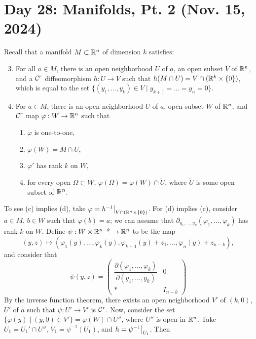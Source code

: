 \section{Day 28: Manifolds, Pt. 2 (Nov. 15, 2024)}
Recall that a manifold $M \subset \mathbb R^n$ of dimension $k$ satisfies:
\begin{enumerate}[label=(\alph*)]
    \setcounter{enumi}{2}
    \item For all $a \in M$, there is an open neighborhood $U$ of $a$, an open subset $V$ of $\mathbb R^n$, and a $\mathcal C^r$ diffeomorphism $h : U \to V$ such that $h(M \cap U) = V \cap (\mathbb R^k \times \{0\})$, which is equal to the set $\{(y_1, \dots, y_k) \in V \mid y_{k+1} = \dots = y_n = 0 \}$.
    \item For $a \in M$, there is an open neighborhood $U$ of $a$, open subset $W$ of $\mathbb R^n$, and $\mathcal C^r$ map $\varphi : W \to \mathbb R^n$ such that
        \begin{enumerate}[label=(\roman*)]
            \item $\varphi$ is one-to-one,
            \item $\varphi(W) = M \cap U$,
            \item $\varphi'$ has rank $k$ on $W$,
            \item for every open $\Omega \subset W$, $\varphi(\Omega) = \varphi(W) \cap \tilde{U}$, where $\tilde{U}$ is some open subset of $\mathbb R^n$.
        \end{enumerate}
\end{enumerate}
To see (c) implies (d), take $\varphi = \restr{h^{-1}}{V \cap (\RR^n \times \{0\})}$. For (d) implies (c), consider $a \in M$, $b \in W$ such that $\varphi(b) = a$; we can assume that $\partial_{y_1, \dots, y_k} (\varphi_1, \dots, \varphi_k)$ has rank $k$ on $W$. Define $\psi : W \times \mathbb R^{n-k}\to \mathbb R^n$ to be the map
\[ (y, z) \mapsto (\varphi_1(y), \dots, \varphi_k(y), \varphi_{k+1}(y) + z_1, \dots, \varphi_{n}(y) + z_{n-k}), \]
and consider that
\[ \psi(y, z) = \left(\begin{array}{c|c} \dfrac{\partial (\varphi_1, \dots, \varphi_k)}{\partial (y_1, \dots, y_k)} & 0 \\ \hline \ast & I_{n-k} \end{array}\right) \]
By the inverse function theorem, there exists an open neighborhood $V'$ of $(k, 0)$, $U'$ of $a$ such that $\psi : U' \to V'$ is $\mathcal C^r$.
\medskip\newline
Now, consider the set $\{\varphi(y) \mid (y, 0) \in V'\} = \varphi(W) \cap U''$, where $U''$ is open in $\mathbb R^n$. Take $U_1 = U_1' \cap U''$, $V_1 = \psi^{-1}(U_1)$, and $h = \restr{\psi^{-1}}{U_1}$. Then
